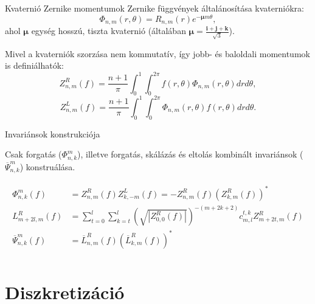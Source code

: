 \documentclass{beamer}
\newcommand{\qi}{\textbf{i}}
\newcommand{\qj}{\textbf{j}}
\newcommand{\qk}{\textbf{k}}
\newcommand{\qmu}{\boldsymbol{\mu}}
\begin{document}
\begin{frame}{Kvaternió Zernike momentumok}
\vskip 3mm
Zernike függvények általánosítása kvaterniókra: $$\Phi_{n,m}(r,\theta) = R_{n,m}(r)e^{-\qmu m \theta},$$ ahol $\qmu$ egység hosszú, tiszta kvaternió (általában $\qmu = \frac{\qi + \qj + \qk}{\sqrt{3}}$).

Mivel a kvaterniók szorzása nem kommutatív, így jobb- és baloldali momentumok is definiálhatók:
$$Z^R_{n,m}(f) = \frac{n+1}{\pi}\int_0^1\int_0^{2\pi}f(r,\theta)\Phi_{n,m}(r,\theta) dr d\theta,$$
$$Z^L_{n,m}(f) = \frac{n+1}{\pi}\int_0^1\int_0^{2\pi}\Phi_{n,m}(r,\theta)f(r,\theta) dr d\theta.$$

\end{frame}

\begin{frame}{Invariánsok konstrukciója}
    \vskip 5mm
    \bigskip

    Csak forgatás ($\Phi_{n,k}^m$), illetve forgatás, skálázás és eltolás kombinált invariánsok ($\overline{\Psi}_{n,k}^m$) konstruálása.

    \begin{gather*}
    \begin{split}
        \Phi_{n,k}^m(f) &= Z_{n,m}^R(f)Z_{k,-m}^L(f) = -Z_{n,m}^R(f)(Z_{k,m}^R(f))^*\\    
        L_{m + 2l,m}^R(f) &= \sum_{t=0}^l\sum_{k=t}^l\left(\sqrt{|Z_{0,0}^R(f)|}\right)^{-(m+2k+2)}c_{m,l}^{t,k}Z_{m+2t,m}^R(f) \\
        \overline{\Psi}_{n,k}^m(f) &= \overline{L}_{n,m}^R(f)(\overline{L}_{k,m}^R(f))^* \\
    \end{split}
    \end{gather*}
\end{frame}

\section{Diszkretizáció}
\end{document}

